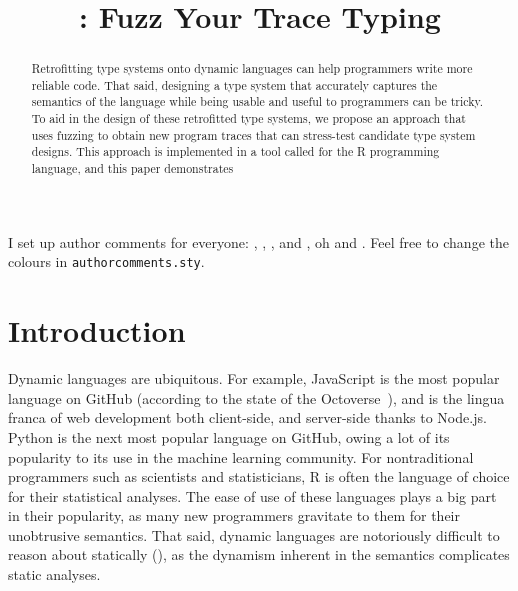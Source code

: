 \documentclass[sigplan,anonymous,review]{acmart}
\begin{document}
\title{\tool: Fuzz Your Trace Typing}

\begin{abstract}

Retrofitting type systems onto dynamic languages can help programmers write more reliable code.
That said, designing a type system that accurately captures the semantics of the language while being usable and useful to programmers can be tricky.
To aid in the design of these retrofitted type systems, we propose an approach that uses fuzzing to obtain new program traces that can stress-test candidate type system designs.
This approach is implemented in a tool called \tool for the R programming language, and this paper demonstrates \AT{\ldots}

\end{abstract}

\maketitle

I set up author comments for everyone: , , , and , oh and . Feel free to change the
colours in {\tt authorcomments.sty}.



\section{Introduction}
\label{sec:introduction}

Dynamic languages are ubiquitous.
For example, JavaScript is the most popular language on GitHub (according to the state of the Octoverse~\cite{state-of-octoverse-2021}), and is the lingua franca of web development both client-side, and server-side thanks to Node.js.
Python is the next most popular language on GitHub, owing a lot of its popularity to its use in the machine learning community.
For nontraditional programmers such as scientists and statisticians, R is often the language of choice for their statistical analyses.
The ease of use of these languages plays a big part in their popularity, as many new programmers gravitate to them for their unobtrusive semantics.
That said, dynamic languages are notoriously difficult to reason about statically (), as the dynamism inherent in the semantics complicates static analyses.
\end{document}
